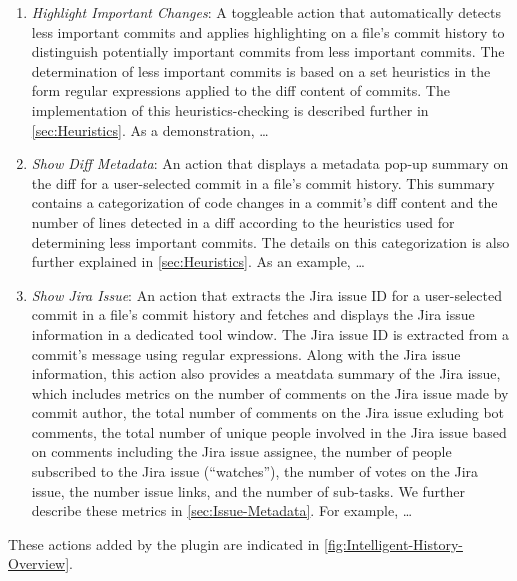 \begin{enumerate}[label=(\Alph*)]
    \item \textit{Highlight Important Changes}: A toggleable action that automatically detects less important commits and applies highlighting on a file's commit history to distinguish potentially important commits from less important commits. The determination of less important commits is based on a set heuristics in the form regular expressions applied to the diff content of commits. The implementation of this heuristics-checking is described further in \autoref{sec:Heuristics}. As a demonstration, \dots {}
    \item \textit{Show Diff Metadata}: An action that displays a metadata pop-up summary on the diff for a user-selected commit in a file's commit history. This summary contains a categorization of code changes in a commit's diff content and the number of lines detected in a diff according to the heuristics used for determining less important commits. The details on this categorization is also further explained in \autoref{sec:Heuristics}. As an example, \dots {}
    \item \textit{Show Jira Issue}: An action that extracts the Jira issue ID for a user-selected commit in a file's commit history and fetches and displays the Jira issue information in a dedicated tool window. The Jira issue ID is extracted from a commit's message using regular expressions. Along with the Jira issue information, this action also provides a meatdata summary of the Jira issue, which includes metrics on the number of comments on the Jira issue made by commit author, the total number of comments on the Jira issue exluding bot comments, the total number of unique people involved in the Jira issue based on comments including the Jira issue assignee, the number of people subscribed to the Jira issue (``watches''), the number of votes on the Jira issue, the number issue links, and the number of sub-tasks. We further describe these metrics in \autoref{sec:Issue-Metadata}. For example, \dots {}
\end{enumerate}

These actions added by the  plugin are indicated in \autoref{fig:Intelligent-History-Overview}.

